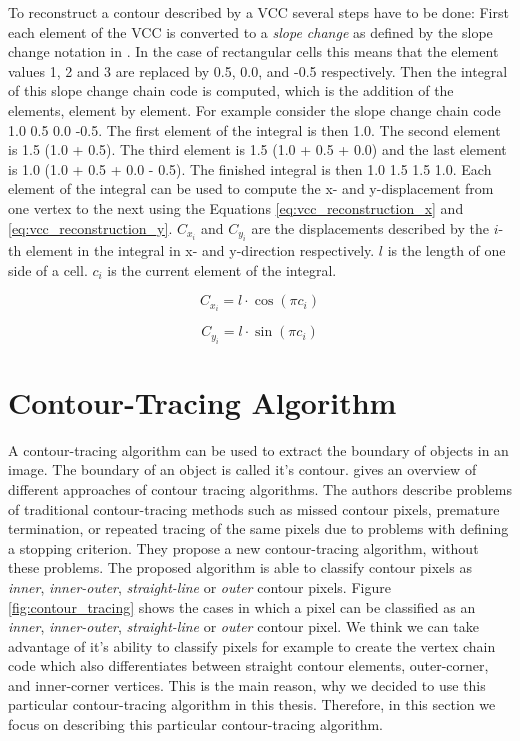 \documentclass[thesis.tex]{subfiles}
\begin{document}
To reconstruct a contour described by a VCC several steps have to be done: First each element of the VCC is converted to a \textit{slope change} as defined by the slope change notation in \cite{slope_change_notation}. In the case of rectangular cells this means that the element values 1, 2 and 3 are replaced by 0.5, 0.0, and -0.5 respectively. Then the integral of this slope change chain code is computed, which is the addition of the elements, element by element. For example consider the slope change chain code 1.0 0.5 0.0 -0.5. The first element of the integral is then 1.0. The second element is 1.5 (1.0 + 0.5). The third element is 1.5 (1.0 + 0.5 + 0.0) and the last element is 1.0 (1.0 + 0.5 + 0.0 - 0.5). The finished integral is then 1.0 1.5 1.5 1.0. Each element of the integral can be used to compute the x- and y-displacement from one vertex to the next using the Equations \ref{eq:vcc_reconstruction_x} and \ref{eq:vcc_reconstruction_y}. $C_{x_i}$ and $C_{y_i}$ are the displacements described by the $i$-th element in the integral in x- and y-direction respectively. $l$ is the length of one side of a cell. $c_i$ is the current element of the integral. 

\begin{equation} \label{eq:vcc_reconstruction_x}
C_{x_i} = l  \cdot \cos(\pi c_i)
\end{equation}

\begin{equation} \label{eq:vcc_reconstruction_y}
C_{y_i} = l  \cdot \sin(\pi c_i)
\end{equation}



\section{Contour-Tracing Algorithm} 
\label{contourtracingalgorithm}
A contour-tracing algorithm can be used to extract the boundary of objects in an image. The boundary of an object is called it's contour. \cite{seo2016fast} gives an overview of different approaches of contour tracing algorithms. The authors describe problems of traditional contour-tracing methods such as missed contour pixels, premature termination, or repeated tracing of the same pixels due to problems with defining a stopping criterion. They propose a new contour-tracing algorithm, without these problems. The proposed algorithm is able to classify contour pixels as \textit{inner}, \textit{inner-outer}, \textit{straight-line} or \textit{outer} contour pixels. Figure \ref{fig:contour_tracing} shows the cases in which a pixel can be classified as an \textit{inner}, \textit{inner-outer}, \textit{straight-line} or \textit{outer} contour pixel. We think we can take advantage of it's ability to classify pixels for example to create the vertex chain code which also differentiates between straight contour elements, outer-corner, and  inner-corner vertices. This is the main reason, why we decided to use this particular contour-tracing algorithm in this thesis. Therefore, in this section we focus on describing this particular contour-tracing algorithm.
\end{document}
